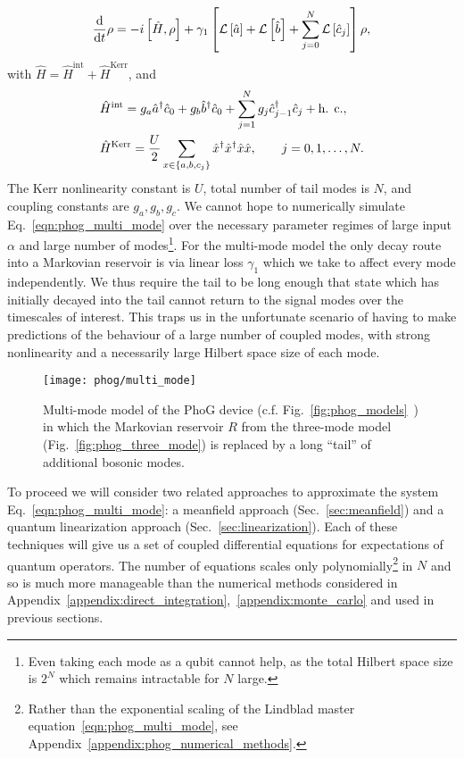 \begin{equation}\label{eqn:phog_multi_mode}
\frac{\mathrm{d}}{\mathrm{d}t} \rho = - i \left[\hat{H}, \rho\right] + \gamma_1 \left[\mathcal{L}\left[\hat{a}\right] + \mathcal{L}\left[\hat{b}\right] + \sum_{j=0}^N \mathcal{L}\left[\hat{c}_j\right] \right] \rho,
\end{equation}
with $\hat{H} = \hat{H}^{\text{int}} + \hat{H}^{\text{Kerr}}$, and
\begin{align}
&\hat{H}^{\text{int}} = g_a \hat{a}^\dagger \hat{c}_0 + g_b \hat{b}^\dagger \hat{c}_0 + \sum_{j=1}^N g_j \hat{c}_{j-1}^\dagger \hat{c}_j + \hc, \notag \\
%
&\hat{H}^{\text{Kerr}} = \frac{U}{2} \sum_{x \in \left\{a, b, c_j\right\}} \hat{x}^\dagger \hat{x}^\dagger \hat{x} \hat{x}, \qq{} j = 0, 1, \dots, N.
\end{align}
The Kerr nonlinearity constant is $U$, total number of tail modes is $N$, and coupling constants are $g_a, g_b, g_c$. We cannot hope to numerically simulate Eq.~\ref{eqn:phog_multi_mode} over the necessary parameter regimes of large input $\alpha$ and large number of modes\footnote{Even taking each mode as a qubit cannot help, as the total Hilbert space size is $2^{N}$ which remains intractable for $N$ large.}. For the multi-mode model the only decay route into a Markovian reservoir is via linear loss $\gamma_1$ which we take to affect every mode independently. We thus require the tail to be long enough that state which has initially decayed into the tail cannot return to the signal modes over the timescales of interest. This traps us in the unfortunate scenario of having to make predictions of the behaviour of a large number of coupled modes, with strong nonlinearity and a necessarily large Hilbert space size of each mode. 

\begin{figure}[htp]
\captionsetup{width=0.8\linewidth}
\centering
\texttt{[image: phog/multi\_mode]}
\caption{\label{fig:phog_multi_mode} Multi-mode model of the PhoG device (c.f. Fig.~\ref{fig:phog_models}~\MakeUppercase{}) in which the Markovian reservoir $R$ from the three-mode model (Fig.~\ref{fig:phog_three_mode}) is replaced by a long ``tail'' of additional bosonic modes.}
\end{figure}

To proceed we will consider two related approaches to approximate the system Eq.~\ref{eqn:phog_multi_mode}: a meanfield approach (Sec.~\ref{sec:meanfield}) and a quantum linearization approach (Sec.~\ref{sec:linearization}). Each of these techniques will give us a set of coupled differential equations for expectations of quantum operators. The number of equations scales only polynomially\footnote{Rather than the exponential scaling of the Lindblad master equation~\ref{eqn:phog_multi_mode}, see Appendix~\ref{appendix:phog_numerical_methods}.} in $N$ and so is much more manageable than the numerical methods considered in Appendix~\ref{appendix:direct_integration},~\ref{appendix:monte_carlo} and used in previous sections.

